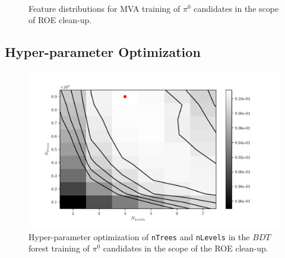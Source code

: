 \begin{figure}[H]
\\
\caption{Feature distributions for MVA training of $\pi^0$ candidates in the scope of ROE clean-up.}
\end{figure}

\subsection{Hyper-parameter Optimization}

\begin{figure}[H]
\centering
\captionsetup{width=0.8\linewidth}
\includegraphics[width=\linewidth]{fig/addendums/pi0_hpo}
\caption{Hyper-parameter optimization of \texttt{\footnotesize nTrees} and \texttt{\footnotesize nLevels} in the $BDT$ forest training of $\pi^0$ candidates in the scope of the ROE clean-up.}
\end{figure}

